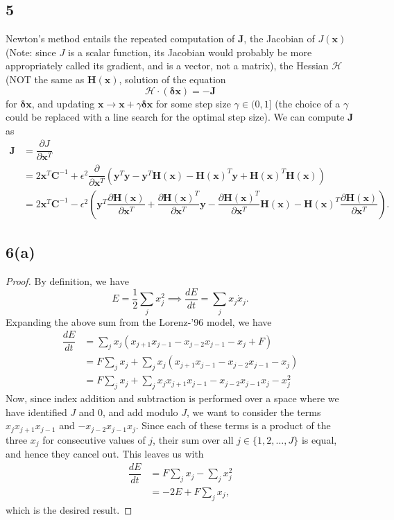 \documentclass[11pt]{article}
\begin{document}
\subsection*{5}
Newton's method entails the repeated computation of $\mathbf{J}$, the Jacobian of $J(\mathbf{x})$ (Note: since $J$ is a scalar function, its Jacobian would probably be more appropriately called its gradient, and is a vector, not a matrix), the Hessian $\mathbf{\mathcal{H}}$ (NOT the same as $\mathbf{H(x)}$, solution of the equation
\[
 \mathbf{\mathcal{H}} \cdot (\mathbf{\delta x}) = -\mathbf{J} \tag{6}
 \]
for $\mathbf{\delta x}$, and updating $\mathbf{x}\to\mathbf{x} + \gamma\mathbf{\delta x}$ for some step size $\gamma\in (0,1] $ (the choice of a $\gamma$ could be replaced with a line search for the optimal step size). We can compute $\mathbf{J}$ as 
\[
\begin{aligned}
\mathbf{J} &= \dfrac{\partial J}{\partial\mathbf{x}^T}\\
&= 2\mathbf{x}^T\mathbf{C}^{-1} +  \epsilon^2 \dfrac{\partial}{\partial\mathbf{x}^T}\left(\mathbf{y}^T\mathbf{y} - \mathbf{y}^T\mathbf{H(x)} - \mathbf{H(x)}^T\mathbf{y} + \mathbf{H(x)}^T\mathbf{H(x)}\right)\\
&= 2\mathbf{x}^T\mathbf{C}^{-1} - \epsilon^2\left(\mathbf{y}^T\dfrac{\partial\mathbf{H(x)}}{\partial\mathbf{x}^T} + \dfrac{\partial\mathbf{H(x)}^T}{\partial\mathbf{x}^T}\mathbf{y} - \dfrac{\partial\mathbf{H(x)}^T}{\partial\mathbf{x}^T}\mathbf{H(x)} - \mathbf{H(x)}^T\dfrac{\partial\mathbf{H(x)}}{\partial\mathbf{x}^T}\right).
\end{aligned}
\]

\subsection*{6(a)}
\begin{proof}
 By definition, we have
 \[
 E = \dfrac{1}{2}\sum\limits_j x_j^2\implies \dfrac{dE}{dt} =\sum\limits_j x_j \dot{x}_j .\tag{7}
 \]
Expanding the above sum from the Lorenz-'96 model, we have
\[
\begin{aligned}
\dfrac{dE}{dt} &= \sum\limits_j x_j (x_{j+1}x_{j-1} - x_{j-2}x_{j-1} - x_j + F)\\
&= F\sum\limits_j x_j + \sum\limits_j x_j(x_{j+1}x_{j-1} - x_{j-2}x_{j-1} - x_j)\\
&= F\sum\limits_j x_j + \sum\limits_j x_jx_{j+1}x_{j-1} - x_{j-2}x_{j-1}x_j - x_j^2
\end{aligned}
\]
Now, since index addition and subtraction is performed over a space where we have identified $J$ and $0$, and add modulo $J$, we want to consider the terms $x_jx_{j+1}x_{j-1}$ and  $- x_{j-2}x_{j-1}x_j$. Since each of these terms is a product of the three $x_j$ for consecutive values of $j$, their sum over all $j\in \{1,2,\ldots , J\}$ is equal, and hence they cancel out. This leaves us with
\[
\begin{aligned}
\dfrac{dE}{dt} &= F\sum\limits_j x_j - \sum\limits_j x_j^2\\
&= -2E + F\sum\limits_j x_j,
\end{aligned}
\]
which is the desired result.
\end{proof}
\end{document}
